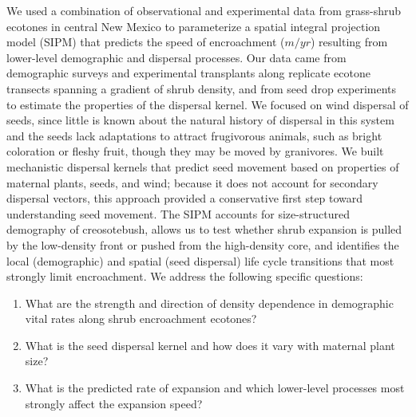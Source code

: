 \documentclass[11pt]{article}\usepackage[]{graphicx}\usepackage[usenames,dvipsnames]{xcolor}
\begin{document}
We used a combination of observational and experimental data from grass-shrub ecotones in central New Mexico to parameterize a spatial integral projection model (SIPM) that predicts the speed of encroachment ($m/yr$) resulting from lower-level demographic and dispersal processes. 
Our data came from demographic surveys and experimental transplants along replicate ecotone transects spanning a gradient of shrub density, and from seed drop experiments to estimate the properties of the dispersal kernel.
We focused on wind dispersal of seeds, since little is known about the natural history of dispersal in this system and the seeds lack adaptations to attract frugivorous animals, such as bright coloration or fleshy fruit, though they may be moved by granivores.
We built mechanistic dispersal kernels that predict seed movement based on properties of maternal plants, seeds, and wind; because it does not account for secondary dispersal vectors, this approach provided a conservative first step toward understanding seed movement.
The SIPM accounts for size-structured demography of creosotebush, allows us to test whether shrub expansion is pulled by the low-density front or pushed from the high-density core, and identifies the local (demographic) and spatial (seed dispersal) life cycle transitions that most strongly limit encroachment. 
We address the following specific questions: 
\begin{enumerate}
\item What are the strength and direction of density dependence in demographic vital rates along shrub encroachment ecotones?
\item What is the seed dispersal kernel and how does it vary with maternal plant size?
\item What is the predicted rate of expansion and which lower-level processes most strongly affect the expansion speed?

\end{enumerate}
\end{document}
